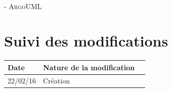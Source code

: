 \documentclass[asi, sansVersion]{picInsa}
\begin{document}
	\begin{center}
		\LARGE
		\textsc{
			\FF{}\\
			 - ArgoUML
		}
	\end{center}
	\vspace{0.5cm}

	\section*{Suivi des modifications}
		\begin{table}[H]
			\centering
			\begin{tabularx}{18cm}{|p{1.7cm}|X|p{4cm}|}
				\hline
				\rowcolor[gray]{0.90} Date & Nature de la modification \\
				\hline
				
				22/02/16 & Création \\
				\hline
			\end{tabularx}
		\end{table}
\end{document}
